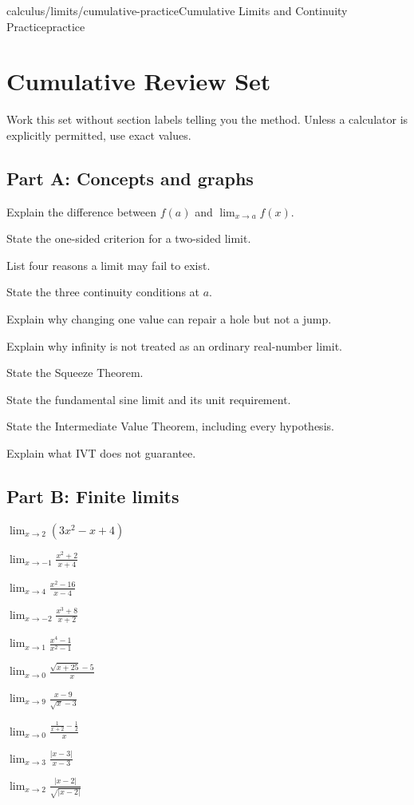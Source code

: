 \documentclass[11pt,openany]{book}
\theoremstyle{bgplain}
\begin{document}
\begin{webpage}{calculus/limits/cumulative-practice}{Cumulative Limits and Continuity Practice}{practice}
\section{Cumulative Review Set}

Work this set without section labels telling you the method. Unless a calculator is explicitly permitted, use exact values.

\subsection*{Part A: Concepts and graphs}
\begin{bgexercises}[label=\textbf{R\arabic*.}]
  \item Explain the difference between \(f(a)\) and \(\lim_{x\to a}f(x)\).
  \item State the one-sided criterion for a two-sided limit.
  \item List four reasons a limit may fail to exist.
  \item State the three continuity conditions at \(a\).
  \item Explain why changing one value can repair a hole but not a jump.
  \item Explain why infinity is not treated as an ordinary real-number limit.
  \item State the Squeeze Theorem.
  \item State the fundamental sine limit and its unit requirement.
  \item State the Intermediate Value Theorem, including every hypothesis.
  \item Explain what IVT does not guarantee.
\end{bgexercises}

\subsection*{Part B: Finite limits}
\begin{bgexercises}[label=\textbf{R\arabic*.},resume]
  \item \(\displaystyle\lim_{x\to2}(3x^2-x+4)\)
  \item \(\displaystyle\lim_{x\to-1}\frac{x^2+2}{x+4}\)
  \item \(\displaystyle\lim_{x\to4}\frac{x^2-16}{x-4}\)
  \item \(\displaystyle\lim_{x\to-2}\frac{x^3+8}{x+2}\)
  \item \(\displaystyle\lim_{x\to1}\frac{x^4-1}{x^2-1}\)
  \item \(\displaystyle\lim_{x\to0}\frac{\sqrt{x+25}-5}{x}\)
  \item \(\displaystyle\lim_{x\to9}\frac{x-9}{\sqrt{x}-3}\)
  \item \(\displaystyle\lim_{x\to0}\frac{\frac1{x+2}-\frac12}{x}\)
  \item \(\displaystyle\lim_{x\to3}\frac{|x-3|}{x-3}\)
  \item \(\displaystyle\lim_{x\to2}\frac{|x-2|}{\sqrt{|x-2|}}\)
\end{bgexercises}


\end{webpage}
\end{document}
